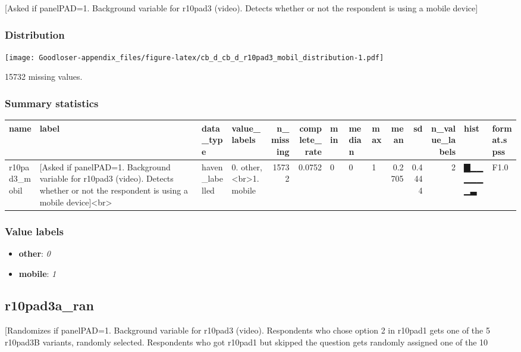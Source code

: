 \documentclass[
]{book}
\providecommand{\tightlist}{%
  \setlength{\itemsep}{0pt}\setlength{\parskip}{0pt}}
\begin{document}
{[}Asked if panelPAD=1. Background variable for r10pad3 (video). Detects whether or not the respondent is using a mobile device{]}

\hypertarget{r10pad3_mobil_distribution}{%
\subsubsection{Distribution}\label{r10pad3_mobil_distribution}}

\texttt{[image: Goodloser-appendix\_files/figure-latex/cb\_d\_cb\_d\_r10pad3\_mobil\_distribution-1.pdf]}

15732 missing values.

\hypertarget{r10pad3_mobil_summary}{%
\subsubsection{Summary statistics}\label{r10pad3_mobil_summary}}

\begin{tabular}{l|l|l|l|r|r|l|l|l|r|r|r|l|l}
\hline
name & label & data_type & value_labels & n_missing & complete_rate & min & median & max & mean & sd & n_value_labels & hist & format.spss\\
\hline
r10pad3_mobil & [Asked if panelPAD=1. Background variable for r10pad3 (video). Detects whether or not the respondent is using a mobile device]<br> & haven_labelled & 0. other,<br>1. mobile & 15732 & 0.0752 & 0 & 0 & 1 & 0.2705 & 0.4444 & 2 & ▇▁▁▁▁▁▁▃ & F1.0\\
\hline
\end{tabular}

\hypertarget{r10pad3_mobil_labels}{%
\subsubsection{Value labels}\label{r10pad3_mobil_labels}}

\begin{itemize}
\tightlist
\item
  \textbf{other}: \emph{0}
\item
  \textbf{mobile}: \emph{1}
\end{itemize}

\hypertarget{r10pad3a_ran}{%
\subsection{r10pad3a\_ran}\label{r10pad3a_ran}}

{[}Randomizes if panelPAD=1. Background variable for r10pad3 (video). Respondents who chose option 2 in r10pad1 gets one of the 5 r10pad3B variants, randomly selected. Respondents who got r10pad1 but skipped the question gets randomly assigned one of the 10
\end{document}
